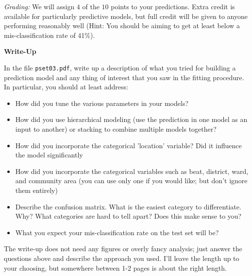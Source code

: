 \documentclass[12pt]{article}
\begin{document}
\textit{Grading:} We will assign $4$ of the $10$ points to your predictions.
Extra credit is available for particularly predictive models, but full credit
will be given to anyone performing reasonably well (Hint: You should be aiming
to get at least below a mis-classification rate of 41\%).

\newpage

\textbf{Write-Up}

In the file \texttt{pset03.pdf}, write up a description of what you tried for
building a prediction model and any thing of interest that you saw in the fitting
procedure. In particular, you should at least address:
\begin{itemize}
\item How did you tune the various parameters in your models?
\item How did you use hierarchical modeling (use the prediction in
  one model as an input to another) or stacking to combine multiple
  models together?
\item How did you incorporate the categorical 'location' variable?
  Did it influence the model significantly
\item How did you incorporate the categorical variables
  such as beat, district, ward, and community area
  (you can use only one if you would like; but don't ignore them entirely)
\item Describe the confusion matrix. What is the easiest category to
  differentiate. Why? What categories are hard to tell apart? Does this
  make sense to you?
\item What you expect your mis-classification rate on the test set will be?
\end{itemize}
The write-up does not need any figures or overly fancy analysis; just answer
the questions above and describe the approach you used. I'll leave the
length up to your choosing, but somewhere between 1-2 pages is about the
right length.
\end{document}
